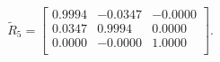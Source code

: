 \begin{equation*}
\widetilde{R}_{5} = 
\begin{bmatrix}
  0.9994 &  -0.0347 &  -0.0000 \\
  0.0347 &   0.9994 &   0.0000 \\
  0.0000 &  -0.0000 &   1.0000 \\
\end{bmatrix}.
\end{equation*}
